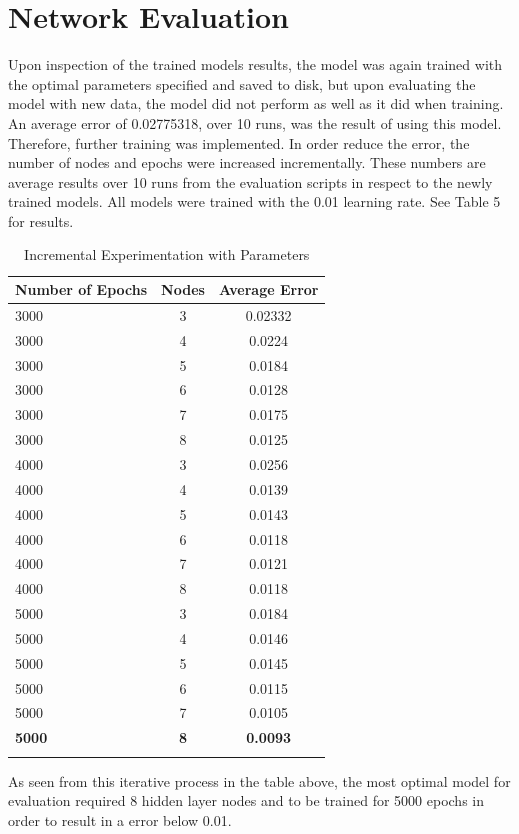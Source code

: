 \section*{Network Evaluation}
Upon inspection of the trained models results, the model was again trained with the optimal parameters specified and saved to disk, but upon evaluating the model with new data, the model did not perform as well as it did when training.
An average error of 0.02775318, over 10 runs, was the result of using this model. Therefore, further training was implemented. In order reduce the error, the number of nodes and epochs were increased incrementally. These numbers are average results over 10 runs from the evaluation scripts in respect to the newly trained models. All models were trained with the 0.01 learning rate. See Table 5 for results.

 \begin{longtable}{|>{}p{5cm}|c|c|}
	\hline 
	Number of Epochs & Nodes & Average Error\\ 
	\hline 
	3000 & 3 & 0.02332\\ 
	\hline 
	3000 & 4 & 0.0224\\ 
	\hline 
	3000 & 5 & 0.0184\\ 
	\hline
	3000 & 6 & 0.0128\\ 
	\hline	
	3000 & 7 & 0.0175\\ 
	\hline
	3000 & 8 & 0.0125\\ 
	\hline
	\hline
	4000 & 3 & 0.0256\\ 
	\hline	
	4000 & 4 & 0.0139\\ 
	\hline	
	4000 & 5 & 0.0143\\ 
	\hline	
 	4000 & 6 & 0.0118\\ 
	\hline	
 	4000 & 7 & 0.0121\\ 
	\hline
 	4000 & 8 & 0.0118\\ 
	\hline
	\hline
	5000 & 3 & 0.0184\\ 
	\hline	
	5000 & 4 & 0.0146\\ 
	\hline	
	5000 & 5 & 0.0145\\ 
	\hline	
	5000 & 6 & 0.0115\\ 
	\hline	
	5000 & 7 & 0.0105\\ 
	\hline
	\textbf{5000} &\textbf{ 8 }& \textbf{0.0093}\\
	\hline 
	\caption{Incremental Experimentation with Parameters}
\end{longtable}

As seen from this iterative process in the table above, the most optimal model for evaluation required 8 hidden layer nodes and to be trained for 5000 epochs in order to result in a error below 0.01.



